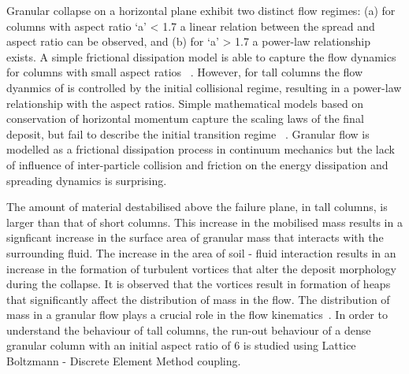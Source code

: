 \documentclass[epj,twocolumn]{webofc}
\begin{document}
Granular collapse on a horizontal plane exhibit two distinct flow regimes:
(a) for columns with aspect ratio ‘a’ < 1.7 a linear relation between the
spread and aspect ratio can be observed, and (b) for ‘a’ > 1.7 a power-law
relationship exists. A simple frictional dissipation model is able to
capture the flow dynamics for columns with small aspect ratios
~\cite{soundararajan2015}. However, for tall columns the flow
dyanmics of is controlled by the initial collisional regime, resulting in a
power-law relationship with the aspect ratios. Simple mathematical models
based on conservation of horizontal momentum capture the scaling laws of
the final deposit, but fail to describe the initial transition regime
~\citep{Kumar2013}. Granular flow is modelled as a frictional dissipation
process in continuum mechanics but the lack of influence of inter-particle
collision and friction on the energy dissipation and spreading dynamics is
surprising.

The amount of material destabilised above the failure plane, in tall columns,
is larger than that of short columns. This increase in the mobilised mass
results in a signficant increase in the surface area of granular mass that
interacts with the surrounding fluid. The increase in the area of soil -
fluid interaction results in an increase
in the formation of turbulent vortices that alter the deposit morphology during 
the collapse. It is observed that the vortices result in formation of heaps 
that significantly affect the distribution of mass in the flow.
The distribution of mass in a granular flow plays a crucial role in the
flow kinematics~\cite{Staron2007a}. In order to understand the
behaviour of tall columns, the run-out behaviour of a dense granular column
with an initial aspect ratio of 6 is studied using Lattice Boltzmann - Discrete
Element Method coupling.
\end{document}
